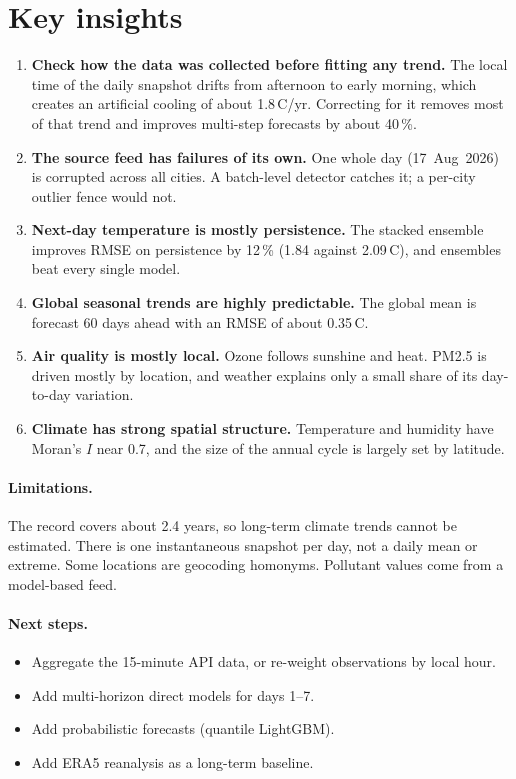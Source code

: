 \section{Key insights}
\begin{enumerate}
  \item \textbf{Check how the data was collected before fitting any trend.} The local time of the daily
        snapshot drifts from afternoon to early morning, which creates an artificial cooling of about
        1.8\,\textdegree C/yr. Correcting for it removes most of that trend and improves multi-step
        forecasts by about 40\,\%.
  \item \textbf{The source feed has failures of its own.} One whole day (17~Aug~2026) is corrupted across all
        cities. A batch-level detector catches it; a per-city outlier fence would not.
  \item \textbf{Next-day temperature is mostly persistence.} The stacked ensemble improves RMSE on persistence
        by 12\,\% (1.84 against 2.09\,\textdegree C), and ensembles beat every single model.
  \item \textbf{Global seasonal trends are highly predictable.} The global mean is forecast 60 days ahead
        with an RMSE of about 0.35\,\textdegree C.
  \item \textbf{Air quality is mostly local.} Ozone follows sunshine and heat. PM2.5 is driven mostly by
        location, and weather explains only a small share of its day-to-day variation.
  \item \textbf{Climate has strong spatial structure.} Temperature and humidity have Moran's $I$ near 0.7,
        and the size of the annual cycle is largely set by latitude.
\end{enumerate}

\paragraph{Limitations.} The record covers about 2.4 years, so long-term climate trends cannot be estimated.
There is one instantaneous snapshot per day, not a daily mean or extreme. Some locations are geocoding
homonyms. Pollutant values come from a model-based feed.

\paragraph{Next steps.}
\begin{itemize}
  \item Aggregate the 15-minute API data, or re-weight observations by local hour.
  \item Add multi-horizon direct models for days 1--7.
  \item Add probabilistic forecasts (quantile LightGBM).
  \item Add ERA5 reanalysis as a long-term baseline.
\end{itemize}
